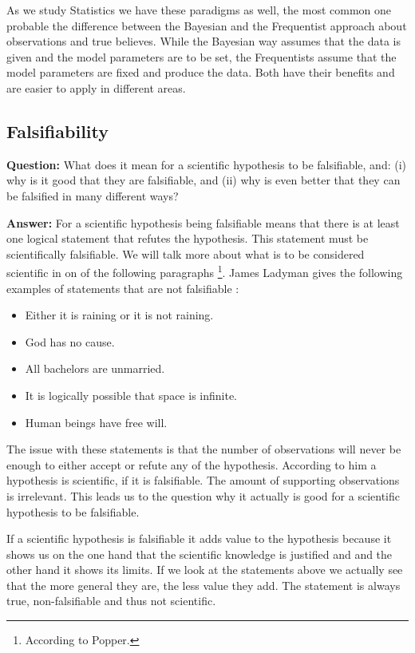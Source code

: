 \documentclass[11pt]{scrartcl}
\begin{document}
As we study Statistics we have these paradigms as well, the most common one probable the difference between the Bayesian and the Frequentist approach about observations and true believes. While the Bayesian way assumes that the data is given and the model parameters are to be set, the Frequentists assume that the model parameters are fixed and produce the data. Both have their benefits and are easier to apply in different areas.

\subsection{Falsifiability}

\textbf{Question:} What does it mean for a scientific hypothesis to be falsifiable, and: (i) why is it good that they are falsifiable, and (ii) why is even better that they can be falsified in many different ways?

\bigbreak

\textbf{Answer:} For a scientific hypothesis being falsifiable means that there is at least one logical statement that refutes the hypothesis. This statement must be scientifically falsifiable. We will talk more about what is to be considered scientific in on of the following paragraphs \footnote{According to Popper.}. James Ladyman gives the following examples of statements that are not falsifiable \cite[p. 69]{ladyman}:

\begin{itemize}
  \item Either it is raining or it is not raining.
  \item God has no cause.
  \item All bachelors are unmarried.
  \item It is logically possible that space is infinite.
  \item Human beings have free will.
\end{itemize}

The issue with these statements is that the number of observations will never be enough to either accept or refute any of the hypothesis. According to him a hypothesis is scientific, if it is falsifiable. The amount of supporting observations is irrelevant. This leads us to the question why it actually is good for a scientific hypothesis to be falsifiable.

If a scientific hypothesis is falsifiable it adds value to the hypothesis because it shows us on the one hand that the scientific knowledge is justified and and the other hand it shows its limits. If we look at the statements above we actually see that the more general they are, the less value they add. The statement  is always true, non-falsifiable and thus not scientific.
\end{document}
